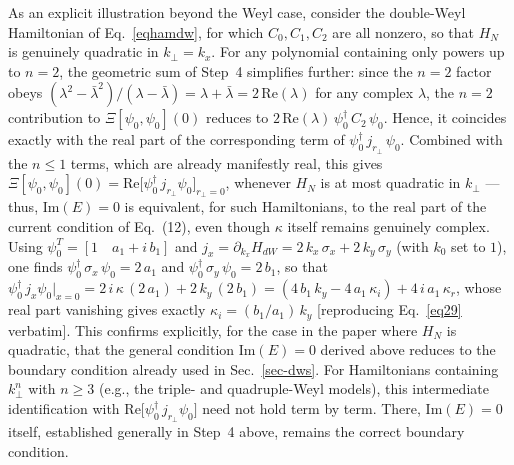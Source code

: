\documentclass[aps,prb,onecolumn, footinbib, 10pt]{revtex4-2}
\begin{document}
{{\begin{itemize}
\end{itemize}

As an explicit illustration beyond the Weyl case, consider the double-Weyl Hamiltonian of Eq.~\eqref{eqhamdw}, for which $C_0,C_1,C_2$ are all nonzero, so that $H_N$ is genuinely quadratic in $k_\perp=k_x$. For any polynomial containing only powers up to $n=2$, the geometric sum of Step~4 simplifies further: since the $n=2$ factor obeys $(\lambda^2-\bar\lambda^2)/(\lambda-\bar\lambda)=\lambda+\bar\lambda=2\,\mathrm{Re}(\lambda)$ for any complex $\lambda$, the $n=2$ contribution to $\Xi[\psi_0,\psi_0](0)$ reduces to $2\,\mathrm{Re}(\lambda)\,\psi_0^\dagger \,  C_2 \, \psi_0$. Hence, it coincides exactly with the real part of the corresponding term of $\psi_0^\dagger \,j_{r_\perp}\, \psi_0$. Combined with the $n\le1$ terms, which are already manifestly real, this gives $\Xi[\psi_0,\psi_0](0)=\mathrm{Re}\big[\psi_0^\dagger  \, j_{r_\perp} \! \psi_0\big]_{r_\perp=0}$, whenever $H_N$ is at most quadratic in $k_\perp$ --- thus, $\mathrm{Im}(E)=0$ is equivalent, for such Hamiltonians, to the real part of the current condition of Eq.~(12), even though $\kappa$ itself remains genuinely complex. Using $\psi_0^T=[1 \quad a_1+i\,b_1]$ and $j_x=\partial_{k_x}H_{dW}=2 \, k_x\,\sigma_x+2 \, k_y\,\sigma_y$ (with $k_0$ set to $1$), one finds $\psi_0^\dagger\,\sigma_x\,\psi_0=2\, a_1$ and $\psi_0^\dagger \, \sigma_y \, \psi_0=2 \,b_1$, so that $\psi_0^\dagger  \, j_x \! \psi_0\big\vert_{x=0}=2 \, i \, \kappa \, (2 \, a_1)+2 \, k_y \, (2 \, b_1)=(4 \, b_1 \, k_y-4 \, a_1 \, \kappa_i)+4 \, i \, a_1 \, \kappa_r$, whose real part vanishing gives exactly $\kappa_i=(b_1/a_1)\,k_y$ [reproducing Eq.~\eqref{eq29} verbatim]. This confirms explicitly, for the case in the paper where $H_N$ is quadratic, that the general condition $\mathrm{Im}(E)=0$ derived above reduces to the boundary condition already used in Sec.~\ref{sec-dws}. For Hamiltonians containing $k_\perp^n$ with $n\ge3$ (e.g., the triple- and quadruple-Weyl models), this intermediate identification with $\mathrm{Re}\big[\psi_0^\dagger  \, j_{r_\perp}\! \psi_0\big]$ need not hold term by term. There, $\mathrm{Im}(E)=0$ itself, established generally in Step~4 above, remains the correct boundary condition.
}}


\end{document}
